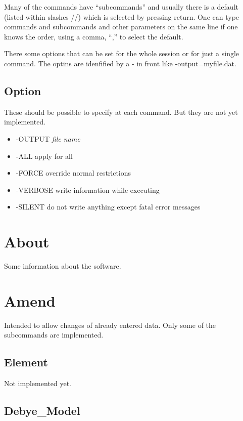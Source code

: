 \documentclass[12pt]{article}
\begin{document}
Many of the commands have ``subcommands'' and usually there is a
default (listed within slashes //) which is selected by pressing
return.  One can type commands and subcommands and other parameters on
the same line if one knows the order, using a comma, ``,'' to select
the default.

There some options that can be set for the whole session or for just a
single command.  The optins are idenfified by a - in front like
-output=myfile.dat.

\subsection{Option}

These should be possible to specify at each command.  But
they are not yet implemented.

\begin{itemize}
\item -OUTPUT {\em file name}
\item -ALL apply for all
\item -FORCE override normal restrictions
\item -VERBOSE write information while executing
\item -SILENT do not write anything except fatal error messages
\end{itemize}
\section{About}

Some information about the software.

\section{Amend}

Intended to allow changes of already entered data. Only some
of the subcommands are implemented.

\subsection{Element}

Not implemented yet.

\subsection{Debye\_Model}
\end{document}
